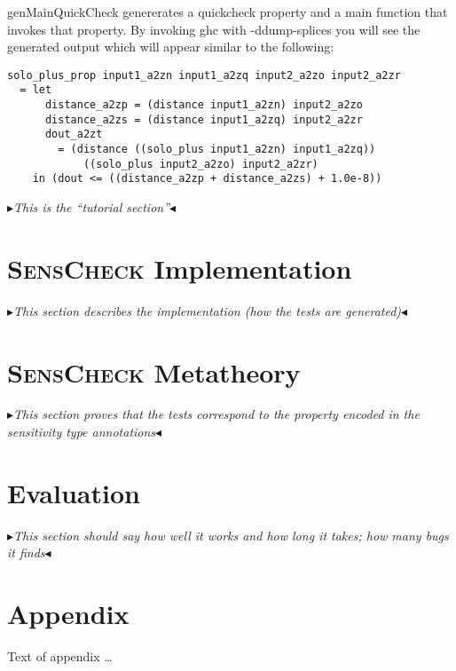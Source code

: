 \documentclass[acmsmall,review,anonymous]{acmart}\settopmatter{printfolios=true,printccs=false,printacmref=false}
\newcommand{\system}{\textsc{SensCheck}\xspace}
\newcommand{\mynote}[2]
    {{\color{red} \fbox{\bfseries\sffamily\scriptsize#1}
    {\small$\blacktriangleright$\textsf{\emph{#2}}$\blacktriangleleft$}}~}
\newcommand{\todo}[1]{\mynote{TODO}{#1}}
\begin{document}
genMainQuickCheck genererates a quickcheck property and a main function that invokes that property.
By invoking ghc with -ddump-splices you will see the generated output which will appear similar to the following:
\begin{verbatim}
solo_plus_prop input1_a2zn input1_a2zq input2_a2zo input2_a2zr
  = let
      distance_a2zp = (distance input1_a2zn) input2_a2zo
      distance_a2zs = (distance input1_a2zq) input2_a2zr
      dout_a2zt
        = (distance ((solo_plus input1_a2zn) input1_a2zq))
            ((solo_plus input2_a2zo) input2_a2zr)
    in (dout <= ((distance_a2zp + distance_a2zs) + 1.0e-8))
\end{verbatim}

\todo{This is the ``tutorial section''}

\section{\system Implementation}

\todo{This section describes the implementation (how the tests are generated)}

\section{\system Metatheory}

\todo{This section proves that the tests correspond to the property encoded in the sensitivity type annotations}

\section{Evaluation}

\todo{This section should say how well it works and how long it takes; how many bugs it finds}


\appendix
\section{Appendix}

Text of appendix \ldots
\end{document}
